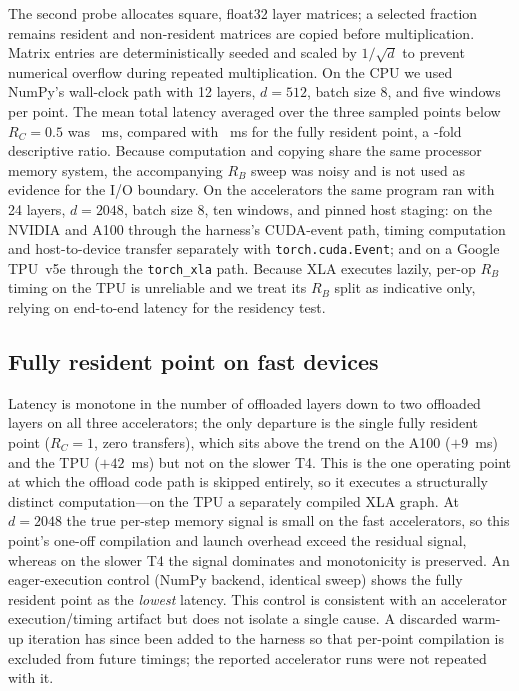 The second probe allocates square, float32 layer matrices; a selected fraction
remains resident and non-resident matrices are copied before multiplication.
Matrix entries are deterministically seeded and scaled by $1/\sqrt{d}$ to prevent
numerical overflow during repeated multiplication. On the CPU we used NumPy's
wall-clock path with 12 layers, $d=512$, batch size 8, and five windows per
point. The mean total latency averaged over the three sampled points below
$R_C=0.5$ was \MatrixLowMeanMs~ms, compared with \MatrixFullMeanMs~ms for the
fully resident point, a \MatrixLatencyRatio-fold descriptive ratio. Because
computation and copying share the same processor memory system, the
accompanying $R_B$ sweep was noisy and is not used as evidence for the I/O
boundary. On the accelerators the same program ran with 24 layers,
$d=2048$, batch size 8, ten windows, and pinned host staging: on the NVIDIA
\GpuDevice{} and A100 through the harness's CUDA-event path, timing computation
and host-to-device transfer separately with \texttt{torch.cuda.Event}; and on a
Google TPU~v5e through the \texttt{torch\_xla} path. Because XLA executes lazily,
per-op $R_B$ timing on the TPU is unreliable and we treat its $R_B$ split as
indicative only, relying on end-to-end latency for the residency test.

\subsection*{Fully resident point on fast devices}

Latency is monotone in the number of offloaded layers down to two offloaded
layers on all three accelerators; the only departure is the single fully
resident point ($R_C=1$, zero transfers), which sits above the trend on the
A100 ($+9$~ms) and the TPU ($+42$~ms) but not on the slower T4. This is the one
operating point at which the offload code path is skipped entirely, so it
executes a structurally distinct computation---on the TPU a separately compiled
XLA graph. At $d=2048$ the true per-step memory signal is small on the fast
accelerators, so this point's one-off compilation and launch overhead exceed
the residual signal, whereas on the slower T4 the signal dominates and
monotonicity is preserved. An eager-execution control (NumPy backend, identical
sweep) shows the fully resident point as the \emph{lowest} latency. This
control is consistent with an accelerator execution/timing artifact but does
not isolate a single cause. A discarded warm-up iteration has since been added
to the harness so that per-point compilation is excluded from future timings;
the reported accelerator runs were not repeated with it.

